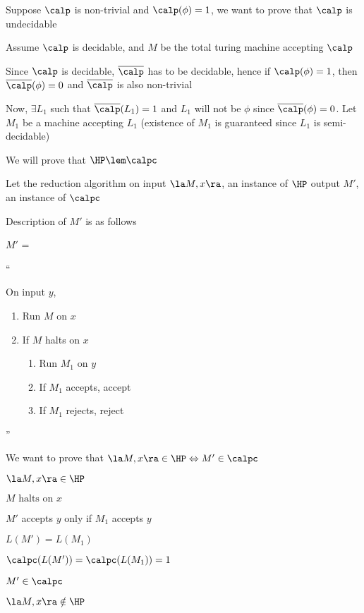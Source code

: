 

Suppose $\calp$ is non-trivial and $\calp(\phi) = 1$, we want to prove that $\calp$ is undecidable

Assume $\calp$ is decidable, and $M$ be the total turing machine accepting $\calp$

Since $\calp$ is decidable, $\overline{\calp}$ has to be decidable, hence if $\calp(\phi) = 1$, then $\overline{\calp}(\phi) = 0$ and $\overline{\calp}$ is also non-trivial

Now, $\exists L_1$ such that $\overline{\calp}(L_1) = 1$ and $L_1$ will not be $\phi$ since $\overline{\calp}(\phi) = 0$. Let $M_1$ be a machine accepting $L_1$ (existence of $M_1$ is guaranteed since $L_1$ is semi-decidable)


We will prove that ${\HP} \lem \calpc$

Let the reduction algorithm on input $\la M, x \ra$, an instance of ${\HP}$ output $M'$, an instance of $\calpc$

Description of $M'$ is as follows

$M'$ = 

``

On input $y$,
\begin{enumerate}
    \item Run $M$ on $x$
    \item If $M$ halts on $x$
        \begin{enumerate}
            \item Run $M_1$ on $y$
            \item If $M_1$ accepts, accept
            \item If $M_1$ rejects, reject
        \end{enumerate}
\end{enumerate}

''

We want to prove that $\la M, x\ra \in {\HP} \Leftrightarrow M' \in \calpc$


$\la M, x \ra \in {\HP}$

\imp
$M \text{ halts on } x$

\imp
$M'$ accepts $y$ only if $M_1$ accepts $y$

\imp
$L(M') = L(M_1)$

\imp
$\calpc(L(M')) = \calpc(L(M_1)) = 1$

\imp
$M' \in \calpc$








$\la M, x \ra \notin {\HP}$

